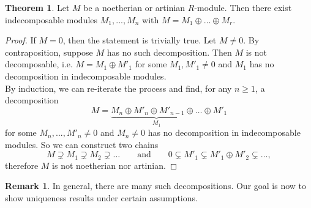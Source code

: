 \documentclass[12pt,a4paper]{report}
\theoremstyle{definition}
\newtheorem{theorem}{Theorem}[chapter] %
\newtheorem*{remark}{Remark}
\theoremstyle{num.custom-title}
\begin{document}
\begin{theorem}\label{thm_noeth_or_art_indec}
Let $M$ be a noetherian or artinian $R$-module. Then there exist indecomposable modules $M_1,...,M_n$ with $M=M_1 \oplus \ldots \oplus M_r$.
\begin{proof}
If $M=0$, then the statement is trivially true. Let $M \neq 0$. By contraposition, suppose $M$ has no such decomposition. Then $M$ is not decomposable, i.e. $M = M_1 \oplus M'_1$ for some $M_1,M'_1 \neq 0$ and $M_1$ has no decomposition in indecomposable modules.\\
By induction, we can re-iterate the process and find, for any $n \geq 1$, a decomposition
\[
M = \underbrace{M_n \oplus M'_n \oplus M'_{n-1} \oplus \ldots }_{M_1} \oplus M'_1
\]
for some $M_n,...,M'_n \neq 0$ and $M_n \neq 0$ has no decomposition in indecomposable modules. So we can construct two chains
\[
M \supsetneq M_1 \supsetneq M_2 \supsetneq \ldots \quad \quad \text{and} \quad \quad 0 \subsetneq M'_1 \subsetneq M'_1 \oplus M'_2 \subsetneq \ldots,
\]
therefore $M$ is not noetherian nor artinian.
\end{proof}
\end{theorem}

\begin{remark}
In general, there are many such decompositions. Our goal is now to show uniqueness results under certain assumptions.
\end{remark}
\end{document}

